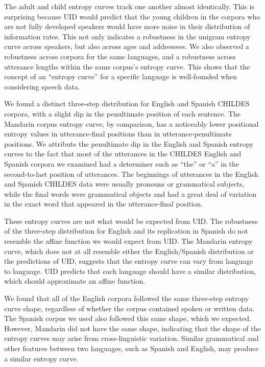 \documentclass[10pt, letterpaper]{article}
\begin{document}
The adult and child entropy curves track one another almost identically.
This is surprising because UID would predict that the young children in
the corpora who are not fully developed speakers would have more noise
in their distribution of information rates. This not only indicates a
robustness in the unigram entropy curve across speakers, but also across
ages and addressees. We also observed a robustness across corpora for
the same languages, and a robustness across utterance lengths within the
same corpus's entropy curve. This shows that the concept of an ``entropy
curve'' for a specific language is well-founded when considering speech
data.

We found a distinct three-step distribution for English and Spanish
CHILDES corpora, with a slight dip in the penultimate position of each
sentence. The Mandarin corpus entropy curve, by comparison, has a
noticeably lower positional entropy values in utterance-final positions
than in utterance-penultimate positions. We attribute the penultimate
dip in the English and Spanish entropy curves to the fact that most of
the utterances in the CHILDES English and Spanish corpora we examined
had a determiner such as ``the'' or ``a'' in the second-to-last position
of utterances. The beginnings of utterances in the English and Spanish
CHILDES data were usually pronouns or grammatical subjects, while the
final words were grammatical objects and had a great deal of variation
in the exact word that appeared in the utterance-final position.

These entropy curves are not what would be expected from UID. The
robustness of the three-step distribution for English and its
replication in Spanish do not resemble the affine function we would
expect from UID. The Mandarin entropy curve, which does not at all
resemble either the English/Spanish distribution or the predictions of
UID, suggests that the entropy curve can vary from language to language.
UID predicts that each language should have a similar distribution,
which should approximate an affine function.

We found that all of the English corpora followed the same three-step
entropy curve shape, regardless of whether the corpus contained spoken
or written data. The Spanish corpus we used also followed this same
shape, which we expected. However, Mandarin did not have the same shape,
indicating that the shape of the entropy curves may arise from
cross-linguistic variation. Similar grammatical and other features
between two languages, such as Spanish and English, may produce a
similar entropy curve.
\end{document}
